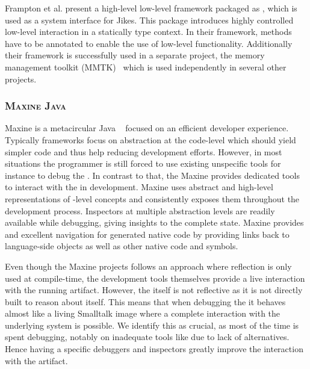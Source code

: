 Frampton et al. present a high-level low-level framework packaged as , which is used as a system interface for Jikes. This package introduces highly controlled low-level interaction in a statically type context.
In their framework, methods have to be annotated to enable the use of low-level functionality.
Additionally their framework is successfully used in a separate project, the memory management toolkit (\textsc{MMTK})~\cite{Blac04a} which is used independently in several other projects.


\subsubsection*{\textsc{Maxine Java \VM}}
Maxine is a metacircular Java \VM~\cite{Wimm13a} focused on an efficient developer experience.
Typically \VM frameworks focus on abstraction at the code-level which should yield simpler code and thus help reducing development efforts.
However, in most situations the programmer is still forced to use existing unspecific tools for instance to debug the \VM.
In contrast to that, the Maxine \VM provides dedicated tools to interact with the \VM in development.
Maxine uses abstract and high-level representations of \VM-level concepts and consistently exposes them throughout the development process.
Inspectors at multiple abstraction levels are readily available while debugging, giving insights to the complete \VM state.
Maxine provides and excellent navigation for generated native code by providing links back to language-side objects as well as other native code and symbols.

Even though the Maxine projects follows an approach where reflection is only used at compile-time, the development tools themselves provide a live interaction with the running \VM artifact.
However, the \VM itself is not reflective as it is not directly built to reason about itself.
This means that when debugging the \VM it behaves almost like a living Smalltalk image where a complete interaction with the underlying system is possible.
We identify this as crucial, as most of the time is spent debugging, notably on inadequate tools like  due to lack of alternatives.
Hence having a specific debuggers and inspectors greatly improve the interaction with the \VM artifact.


